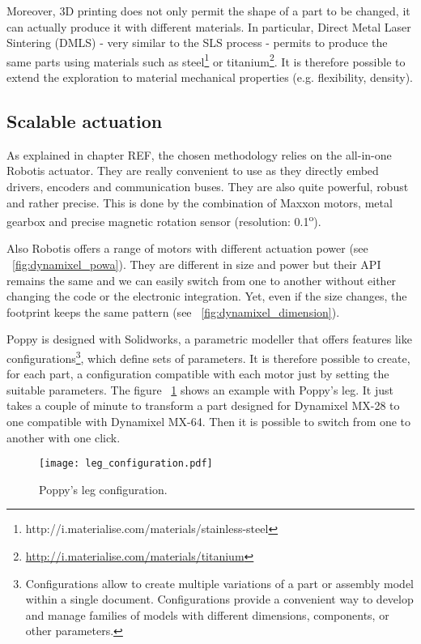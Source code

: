 Moreover, 3D printing does not only permit the shape of a part to be changed, it can actually produce it with different materials. In particular, Direct Metal Laser Sintering (DMLS) - very similar to the SLS process - permits to produce the same parts using materials such as steel\footnote{http://i.materialise.com/materials/stainless-steel} or titanium\footnote{\url{http://i.materialise.com/materials/titanium}}. It is therefore possible to extend the exploration to material mechanical properties (e.g. flexibility, density).


\subsection{Scalable actuation} %

As explained in chapter REF, the chosen methodology relies on the all-in-one Robotis actuator. They are really convenient to use as they directly embed drivers, encoders and communication buses. They are also quite powerful, robust and rather precise. This is done by the combination of Maxxon motors, metal gearbox and precise magnetic rotation sensor (resolution: 0.1\textsuperscript{o}).

Also Robotis offers a range of motors with different actuation power (see \figurename~\ref{fig:dynamixel_powa}). They are different in size and power but their API remains the same and we can easily switch from one to another without either changing the code or the electronic integration. Yet, even if the size changes, the footprint keeps the same pattern (see \figurename~\ref{fig:dynamixel_dimension}).

Poppy is designed with Solidworks, a parametric modeller that offers features like configurations\footnote{Configurations allow to create multiple variations of a part or assembly model within a single document. Configurations provide a convenient way to develop and manage families of models with different dimensions, components, or other parameters.}, which define sets of parameters. It is therefore possible to create, for each part, a configuration compatible with each motor just by setting the suitable parameters. The figure \figurename~\ref{fig:leg_configuration} shows an example with Poppy's leg. It just takes a couple of minute to transform a part designed for Dynamixel MX-28 to one compatible with Dynamixel MX-64. Then it is possible to switch from one to another with one click.

\begin{figure}[h]
    \begin{center}
        \texttt{[image: leg\_configuration.pdf]}
    \end{center}
    \caption{Poppy's leg configuration.}
    \label{fig:leg_configuration}
\end{figure}

